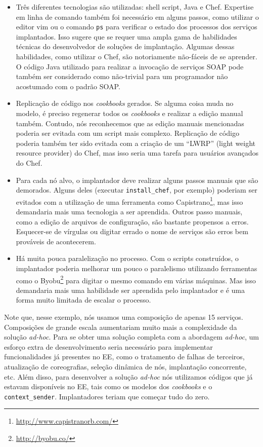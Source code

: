\begin{itemize}

\item Três diferentes tecnologias são utilizadas:
shell script, Java e Chef.
Expertise em linha de comando também foi necessário em alguns passos,
como utilizar o editor vim ou o comando \texttt{ps} para verificar
o estado dos processos dos serviços implantados.
Isso sugere que se requer uma ampla gama de habilidades técnicas
do desenvolvedor de soluções de implantação.
Algumas dessas habilidades, como utilizar o Chef,
são notoriamente não-fáceis de se aprender.
O código Java utilizado para realizar a invocação de serviços SOAP
pode também ser considerado como não-trivial para um programador
não acostumado com o padrão SOAP.

\item Replicação de código nos \emph{cookbooks} gerados.
Se alguma coisa muda no modelo, é preciso regenerar todos os \emph{cookbooks}
e realizar a edição manual também.
Contudo, nós reconhecemos que as edição manuais mencionadas
poderia ser evitada com um script mais complexo.
Replicação de código poderia também ter sido evitada com a criação de um
``LWRP'' (light weight resource provider) do Chef,
mas isso seria uma tarefa para usuários avançados do Chef.

\item Para cada nó alvo, o implantador deve realizar alguns passos manuais
que são demorados. Alguns deles (executar \texttt{install\_chef}, por exemplo)
poderiam ser evitados com a utilização de uma ferramenta como
Capistrano\footnote{\url{http://www.capistranorb.com/}},
mas isso demandaria mais uma tecnologia a ser aprendida.
Outros passo manuais, como a edição de arquivos de configuração, 
são bastante propensos a erros.
Esquecer-se de vírgulas ou digitar errado o nome de serviços
são erros bem prováveis de acontecerem.

\item Há muita pouca paralelização no processo.
Com o scripts construídos, o implantador poderia melhorar
um pouco o paralelismo utilizando ferramentas como o
Byobu\footnote{\url{http://byobu.co/}} 
para digitar o mesmo comando em várias máquinas.
Mas isso demandaria mais uma habilidade ser aprendida pelo implantador
e é uma forma muito limitada de escalar o processo.

\end{itemize}

Note que, nesse exemplo, nós usamos uma composição de apenas 15 serviços.
Composições de grande escala aumentariam muito mais a complexidade da
solução \emph{ad-hoc}.
Para se obter uma solução completa com a abordagem \emph{ad-hoc},
um esforço extra de desenvolvimento seria necessário
para implementar funcionalidades já presentes no EE,
como o tratamento de falhas de terceiros,
atualização de coreografias, seleção dinâmica de nós,
implantação concorrente, etc.
Além disso, para desenvolver a solução \emph{ad-hoc}
nós utilizamos códigos que já estavam disponíveis no EE,
tais como os modelos dos \emph{cookbooks} e o \texttt{context\_sender}.
Implantadores teriam que começar tudo do zero.

